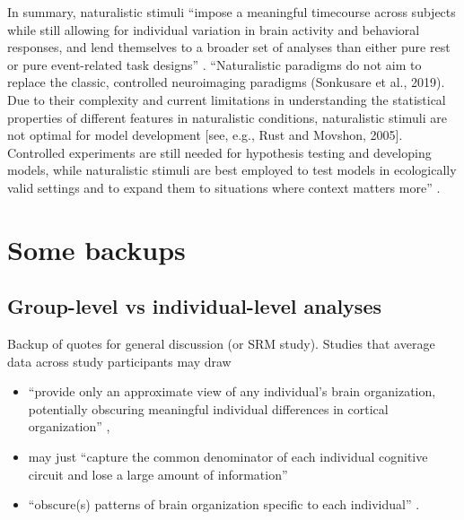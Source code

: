 %
In summary, naturalistic stimuli ``impose a meaningful timecourse across
subjects while still allowing for individual variation in brain activity and
behavioral responses, and lend themselves to a broader set of analyses than
either pure rest or pure event-related task designs'' \citep{finn2017can}.
%
``Naturalistic paradigms do not aim to replace the classic, controlled
neuroimaging paradigms (Sonkusare et al., 2019).
%
Due to their complexity and current limitations in understanding the statistical
properties of different features in naturalistic conditions, naturalistic
stimuli are not optimal for model development [see, e.g., Rust and Movshon,
2005].
%
Controlled experiments are still needed for hypothesis testing and developing
models, while naturalistic stimuli are best employed to test models in
ecologically valid settings and to expand them to situations where context
matters more'' \citep{saarimaki2021naturalistic}.



\pagebreak


\section{Some backups}


\subsection{Group-level vs individual-level analyses}

Backup of quotes for general discussion (or SRM study).  Studies that average
data across study participants may draw

\begin{itemize}

\item ``provide only an approximate view of any individual's brain organization,
    potentially obscuring meaningful individual differences in cortical
        organization'' \citep{laumann2015functional},

\item may just ``capture the common denominator of each individual cognitive
    circuit and lose a large amount of information''

\item ``obscure(s) patterns of brain organization specific to each individual''
    \citep{laumann2015functional}.

\end{itemize}


